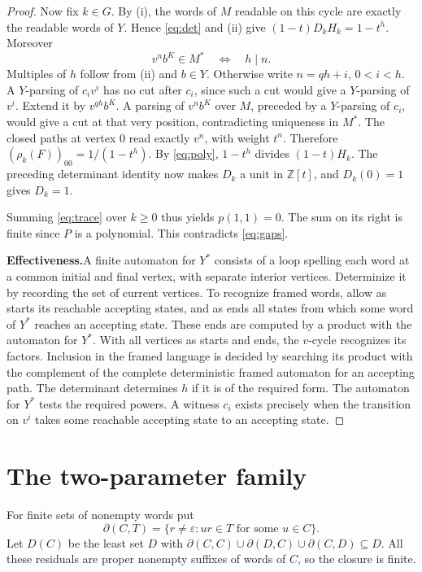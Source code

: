 \documentclass[11pt,a4paper]{article}
\newcommand{\head}[1]{\par\noindent\textbf{#1}\enspace}
\newcommand{\eps}{\varepsilon}
\newcommand{\Z}{\mathbb{Z}}
\begin{document}
\begin{proof}
Now fix $k\in G$. By (i), the words of $M$ readable on this cycle are exactly the readable words of
$Y$. Hence \eqref{eq:det} and (ii) give $(1-t)D_kH_k=1-t^h$. Moreover
\[
  v^nb^K\in M^*\quad\Longleftrightarrow\quad h\mid n.
\]
Multiples of $h$ follow from (ii) and $b\in Y$. Otherwise write $n=qh+i$, $0<i<h$. A $Y$-parsing
of $c_iv^i$ has no cut after $c_i$, since such a cut would give a $Y$-parsing of $v^i$. Extend it
by $v^{qh}b^K$. A parsing of $v^nb^K$ over $M$, preceded by a $Y$-parsing of $c_i$, would give a
cut at that very position, contradicting uniqueness in $M^*$. The closed paths at vertex $0$ read
exactly $v^n$, with weight $t^n$. Therefore $(\rho_k(F))_{00}=1/(1-t^h)$. By \eqref{eq:poly},
$1-t^h$ divides $(1-t)H_k$. The preceding determinant identity now makes $D_k$ a unit in
$\Z[t]$, and $D_k(0)=1$ gives $D_k=1$.

Summing \eqref{eq:trace} over $k\ge0$ thus yields $p(1,1)=0$. The sum on its right is finite since
$P$ is a polynomial. This contradicts \eqref{eq:gaps}.

\head{Effectiveness.}A finite automaton for $Y^*$ consists of a loop spelling each word at a common
initial and final vertex, with separate interior vertices. Determinize it by recording the set of
current vertices. To recognize framed words, allow as starts its reachable accepting states, and as
ends all states from which some word of $Y^*$ reaches an accepting state. These ends are computed
by a product with the automaton for $Y^*$. With all vertices as starts and ends, the $v$-cycle
recognizes its factors. Inclusion in the framed language is decided by searching its product with
the complement of the complete deterministic framed automaton for an accepting path. The
determinant determines $h$ if it is of the required form. The automaton for $Y^*$ tests the
required powers. A witness $c_i$ exists precisely when the transition on $v^i$ takes some
reachable accepting state to an accepting state.
\end{proof}

\section{The two-parameter family}

For finite sets of nonempty words put
\[
  \partial(C,T)=\{r\ne\eps: ur\in T\text{ for some }u\in C\}.
\]
Let $D(C)$ be the least set $D$ with $\partial(C,C)\cup\partial(D,C)\cup\partial(C,D)\subseteq D$.
All these residuals are proper nonempty suffixes of words of $C$, so the closure is finite.
\end{document}
